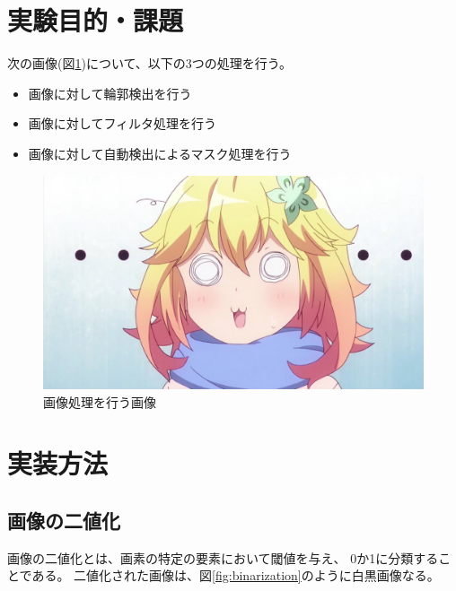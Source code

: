 \documentclass[dvipdfmx]{jsarticle}
\begin{document}
\section{実験目的・課題}

次の画像(図\ref{fig:tapu})について、以下の3つの処理を行う。

\begin{itemize}
  \item 画像に対して輪郭検出を行う
  \item 画像に対してフィルタ処理を行う
  \item 画像に対して自動検出によるマスク処理を行う
\end{itemize}

\begin{figure}[H]
  \centering
  \includegraphics[width=0.7\hsize]{../pic/tapu.png}
  \caption{画像処理を行う画像}
  \label{fig:tapu}
\end{figure}


\section{実装方法}

\subsection{画像の二値化}

画像の二値化とは、画素の特定の要素において閾値を与え、
0か1に分類することである。
二値化された画像は、図\ref{fig:binarization}のように白黒画像なる。
\end{document}
